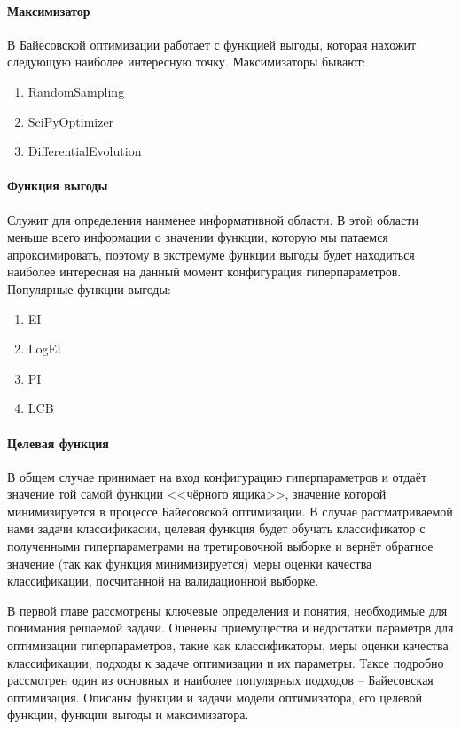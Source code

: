 \documentclass[times,specification,annotation]{itmo-student-thesis}
\begin{document}
	\paragraph{Максимизатор} В Байесовской оптимизации работает с функцией выгоды, которая нахожит следующую наиболее интересную точку. Максимизаторы бывают:
	\begin{enumerate}
		\item RandomSampling
		\item SciPyOptimizer
		\item DifferentialEvolution
	\end{enumerate}
	\paragraph{Функция выгоды} Служит для определения наименее информативной области. В этой области меньше всего информации о значении функции, которую мы патаемся апроксимировать, поэтому в экстремуме функции выгоды будет находиться наиболее интересная на данный момент конфигурация гиперпараметров. Популярные функции выгоды:
	\begin{enumerate}
		\item EI
		\item LogEI
		\item PI
		\item LCB
	\end{enumerate}
	\paragraph{Целевая функция} В общем случае принимает на вход конфигурацию гиперпараметров и отдаёт значение той самой функции <<чёрного ящика>>, значение которой минимизируется в процессе Байесовской оптимизации. В случае рассматриваемой нами задачи классификасии, целевая функция будет обучать классификатор с полученными гиперпараметрами на третировочной выборке и вернёт обратное значение (так как функция минимизируется) меры оценки качества классификации, посчитанной на валидационной выборке. \label{pr:objf}
	
	\chapterconclusion
	В первой главе рассмотрены ключевые определения и понятия, необходимые для понимания решаемой задачи. Оценены приемущества и недостатки параметрв для оптимизации гиперпараметров, такие как классификаторы, меры оценки качества классификации, подходы к задаче оптимизации и их параметры. Таксе подробно рассмотрен один из основных и наиболее популярных подходов -- Байесовская оптимизация. Описаны функции и задачи модели оптимизатора, его целевой функции, функции выгоды и максимизатора.
	
\end{document}
